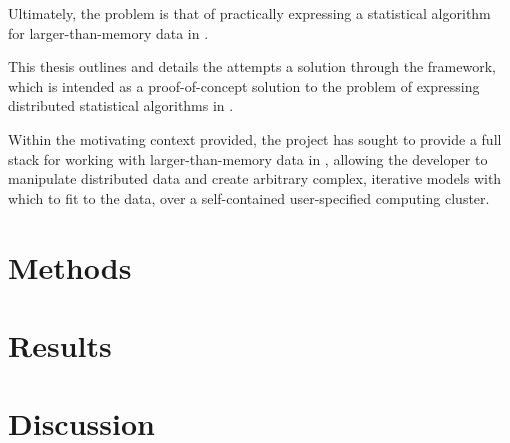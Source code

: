 Ultimately, the problem is that of practically expressing a statistical algorithm for larger-than-memory data in \R{}.

This thesis outlines and details the attempts a solution through the \lsr{} framework, which is intended as a proof-of-concept solution to the problem of expressing distributed statistical algorithms in \R{}.

Within the motivating context provided, the \lsr{} project has sought to provide a full stack for working with larger-than-memory data in \R{}, allowing the developer to manipulate distributed data and create arbitrary complex, iterative models with which to fit to the data, over a self-contained user-specified computing cluster.

\section{Methods}\label{sec:methods}

\section{Results}\label{sec:results}

\section{Discussion}\label{sec:discussion}


